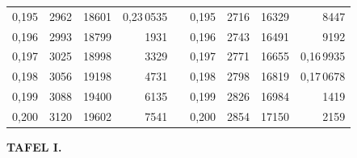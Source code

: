 \begin{tabular}{|c|c|c|r|@{}p{9pt}@{}|c|c|c|r|}
0,195 & 2962 & 18601 & 0,23\,0535 &  & 0,195 & 2716 & 16329 & 8447 \\[3pt]
0,196 & 2993 & 18799 & 1931 &  & 0,196 & 2743 & 16491 & 9192 \\
0,197 & 3025 & 18998 & 3329 &  & 0,197 & 2771 & 16655 & 0,16\,9935 \\
0,198 & 3056 & 19198 & 4731 &  & 0,198 & 2798 & 16819 & 0,17\,0678 \\
0,199 & 3088 & 19400 & 6135 &  & 0,199 & 2826 & 16984 & 1419 \\
0,200 & 3120 & 19602 & 7541 &  & 0,200 & 2854 & 17150 & 2159 \\
\hline
\end{tabular}\par
\endgroup
\clearpage
{}
\begingroup
\centering
\fontsize{9}{9}\selectfont
\setlength{\tabcolsep}{6pt}
\renewcommand{\arraystretch}{1}
\setlength{\parskip}{0pt}
\textbf{TAFEL I.}
\par\vspace{7pt}
